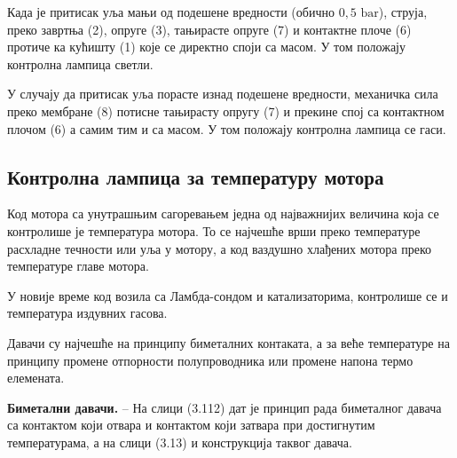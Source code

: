 \documentclass[12pt,a4paper]{report}
\begin{document}
Када је притисак уља мањи од подешене вредности (обично $0{,}5\text{ bar}$), струја, преко завртња (2), опруге (3), тањирасте опруге (7) и контактне плоче (6) протиче ка кућишту (1) које се директно споји са масом. У том положају контролна лампица светли.

У случају да притисак уља порасте изнад подешене вредности, механичка сила преко мембране (8) потисне тањирасту опругу (7) и прекине
спој са контактном плочом (6) а самим тим и са масом. У том положају контролна лампица се гаси.

\subsection{Контролна лампица за температуру мотора}

Код мотора са унутрашњим сагоревањем једна од најважнијих величина која се контролише је температура мотора. То се најчешће врши преко температуре расхладне течности или уља у мотору, а код ваздушно хлађених мотора преко температуре главе мотора.

У новије време код возила са Ламбда-сондом и катализаторима, контролише се и температура издувних гасова.

Давачи су најчешће на принципу биметалних контаката, а за веће температуре на принципу промене отпорности полупроводника или промене напона термо елемената.

\textbf{Биметални давачи.} – На слици (3.112) дат је принцип рада биметалног давача са контактом који отвара и контактом који затвара при достигнутим температурама, а на слици (3.13) и конструкција таквог давача.


\end{document}
